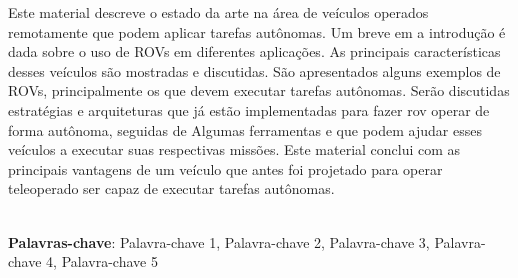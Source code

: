 \begin{thesisresumo}
  Este material descreve o estado da arte na área de veículos operados remotamente que podem aplicar tarefas autônomas. Um breve em
  a introdução é dada sobre o uso de ROVs em diferentes aplicações. As principais características desses veículos são mostradas e discutidas. São apresentados alguns exemplos de ROVs, principalmente os que devem executar tarefas autônomas. Serão discutidas estratégias e arquiteturas que já estão implementadas para fazer rov operar de forma autônoma, seguidas de Algumas ferramentas e que podem ajudar esses veículos a executar suas respectivas missões. Este material conclui com as principais vantagens de um veículo que antes foi projetado para operar teleoperado ser capaz de executar tarefas autônomas.

\ \\


\textbf{Palavras-chave}: Palavra-chave 1, Palavra-chave 2, Palavra-chave 3, Palavra-chave 4, Palavra-chave 5

\end{thesisresumo}
